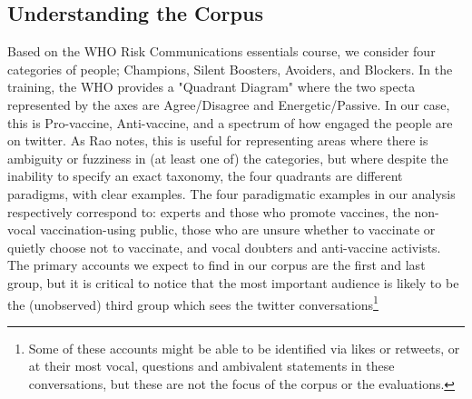 \documentclass{article}
\begin{document}



\subsection{Understanding the Corpus}

Based on the WHO Risk Communications essentials course, we consider four categories of people; Champions, Silent Boosters, Avoiders, and Blockers. In the training, the WHO provides a "Quadrant Diagram" \cite{Rao2009b} where the two specta represented by the axes are Agree/Disagree and Energetic/Passive. In our case, this is Pro-vaccine, Anti-vaccine, and a spectrum of how engaged the people are on twitter. As Rao notes, this is useful for representing areas where there is ambiguity or fuzziness in (at least one of) the categories, but where despite the inability to specify an exact taxonomy, the four quadrants are different paradigms, with clear examples. The four paradigmatic examples in our analysis respectively correspond to: experts and those who promote vaccines, the non-vocal vaccination-using public, those who are unsure whether to vaccinate or quietly choose not to vaccinate, and vocal doubters and anti-vaccine activists. The primary accounts we expect to find in our corpus are the first and last group, but it is critical to notice that the most important audience is likely to be the (unobserved) third group which sees the twitter conversations\footnote{Some of these accounts might be able to be identified via likes or retweets, or at their most vocal, questions and ambivalent statements in these conversations, but these are not the focus of the corpus or the evaluations.}
\end{document}
